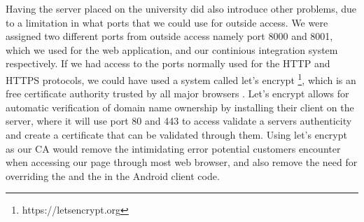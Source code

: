 
\FloatBarrier

Having the server placed on the university did also introduce other problems, due to a limitation in what ports that we could use for outside access. 
We were assigned two different ports from outside access namely port 8000 and 8001, which we used for the web application, and our continious integration system respectively. 
If we had access to the ports normally used for the HTTP and HTTPS protocols, we could have used a system called let's encrypt \footnote{https://letsencrypt.org}, which is an free certificate authority trusted by all major browsers \parencite{lets_encrypt_all_browsers}. Let's encrypt allows for automatic verification of domain name ownership by installing their client on the server, where it will use port 80 and 443 to access validate a servers authenticity and create a certificate that can be validated through them. Using let's encrypt as our CA would remove the intimidating error potential customers encounter when accessing our page through most web browser, and also remove the need for overriding the  and the  in the Android client code.